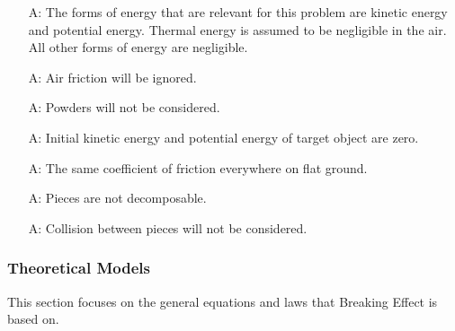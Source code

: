 \documentclass[12pt]{article}
\newcounter{assumpnum} %
\newcommand{\progname}{Breaking Effect} %
\begin{document}
\begin{itemize}

\item[A\refstepcounter{assumpnum}\theassumpnum \label{A_mechanical}:]
 The forms of energy that are relevant for this problem are kinetic energy and potential energy. Thermal energy is assumed to be negligible in the air. All other forms of energy are negligible.

\item[A\refstepcounter{assumpnum}\theassumpnum \label{A_airFriction}:]
Air friction will be ignored.

\item[A\refstepcounter{assumpnum}\theassumpnum \label{A_powder}:]
Powders will not be considered. 

\item[A\refstepcounter{assumpnum}\theassumpnum \label{A_initialPE}:]
Initial kinetic energy and potential energy of target object are zero. 

\item[A\refstepcounter{assumpnum}\theassumpnum \label{A_ground}:]
The same coefficient of friction everywhere on flat ground.​

\item[A\refstepcounter{assumpnum}\theassumpnum \label{A_piece}:]
Pieces are not decomposable. 

\item[A\refstepcounter{assumpnum}\theassumpnum \label{A_collision}:]
Collision between pieces will not be considered. 

\end{itemize}

\subsubsection{Theoretical Models}\label{sec_theoretical}

This section focuses on the general equations and laws that \progname{} is based
on. 

~\newline
\end{document}
